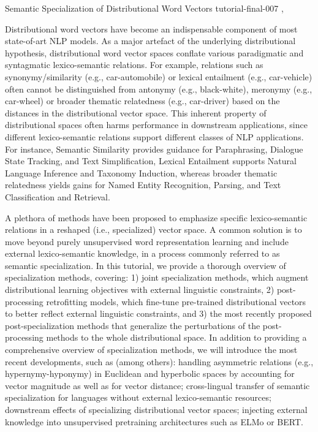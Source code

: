 

\begin{tutorial}{Semantic Specialization of Distributional Word Vectors}
  {tutorial-final-007}
  {\daydateyear, \tutorialafternoontime}
  {\TutLocG}

Distributional word vectors have become an indispensable component of most state-of-art NLP models. As a major artefact of the underlying distributional hypothesis, distributional word vector spaces conflate various paradigmatic and syntagmatic lexico-semantic relations. For example, relations such as synonymy/similarity (e.g., car-automobile) or lexical entailment (e.g., car-vehicle) often cannot be distinguished from antonymy (e.g., black-white), meronymy (e.g., car-wheel) or broader thematic relatedness (e.g., car-driver) based on the distances in the distributional vector space. This inherent property of distributional spaces often harms performance in downstream applications, since different lexico-semantic relations support different classes of NLP applications. For instance, Semantic Similarity provides guidance for Paraphrasing, Dialogue State Tracking, and Text Simplification, Lexical Entailment supports Natural Language Inference and Taxonomy Induction, whereas broader thematic relatedness yields gains for Named Entity Recognition, Parsing, and Text Classification and Retrieval.

A plethora of methods have been proposed to emphasize specific lexico-semantic relations in a reshaped (i.e., specialized) vector space. A common solution is to move beyond purely unsupervised word representation learning and include external lexico-semantic knowledge, in a process commonly referred to as semantic specialization. In this tutorial, we provide a thorough overview of specialization methods, covering: 1) joint specialization methods, which augment distributional learning objectives with external linguistic constraints, 2) post-processing retrofitting models, which fine-tune pre-trained distributional vectors to better reflect external linguistic constraints, and 3) the most recently proposed post-specialization methods that generalize the perturbations of the post-processing methods to the whole distributional space. In addition to providing a comprehensive overview of specialization methods, we will introduce the most recent developments, such as (among others): handling asymmetric relations (e.g., hypernymy-hyponymy) in Euclidean and hyperbolic spaces by accounting for vector magnitude as well as for vector distance; cross-lingual transfer of semantic specialization for languages without external lexico-semantic resources; downstream effects of specializing distributional vector spaces; injecting external knowledge into unsupervised pretraining architectures such as ELMo or BERT.

\end{tutorial}

